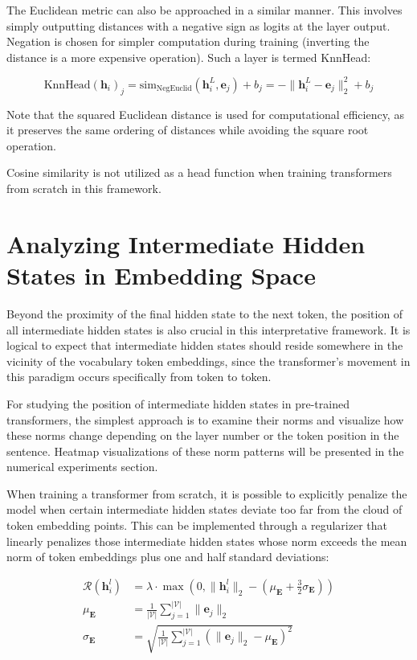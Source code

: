 The Euclidean metric can also be approached in a similar manner. This involves simply outputting distances with a negative sign as logits at the layer output. Negation is chosen for simpler computation during training (inverting the distance is a more expensive operation). Such a layer is termed KnnHead:

\begin{equation}
\text{KnnHead}(\mathbf{h}_i)_j = \text{sim}_{\text{NegEuclid}}(\mathbf{h}_i^L, \mathbf{e}_j) + b_j = -\|\mathbf{h}_i^L - \mathbf{e}_j\|_2^2 + b_j
\end{equation}

Note that the squared Euclidean distance is used for computational efficiency, as it preserves the same ordering of distances while avoiding the square root operation.

Cosine similarity is not utilized as a head function when training transformers from scratch in this framework.

\section{Analyzing Intermediate Hidden States in Embedding Space}\label{reg_info}

Beyond the proximity of the final hidden state to the next token, the position of all intermediate hidden states is also crucial in this interpretative framework. It is logical to expect that intermediate hidden states should reside somewhere in the vicinity of the vocabulary token embeddings, since the transformer's movement in this paradigm occurs specifically from token to token.

For studying the position of intermediate hidden states in pre-trained transformers, the simplest approach is to examine their norms and visualize how these norms change depending on the layer number or the token position in the sentence. Heatmap visualizations of these norm patterns will be presented in the numerical experiments section.


When training a transformer from scratch, it is possible to explicitly penalize the model when certain intermediate hidden states deviate too far from the cloud of token embedding points. This can be implemented through a regularizer that linearly penalizes those intermediate hidden states whose norm exceeds the mean norm of token embeddings plus one and half standard deviations:

\begin{align}
    \mathcal{R}(\mathbf{h}_i^l) &= \lambda \cdot \max(0, \|\mathbf{h}_i^l\|_2 - (\mu_{\mathbf{E}} + \frac{3}{2} \sigma_{\mathbf{E}})) \\
    \mu_{\mathbf{E}} &= \frac{1}{|\mathcal{V}|}\sum_{j=1}^{|\mathcal{V}|}\|\mathbf{e}_j\|_2 \\ 
    \sigma_{\mathbf{E}} &= \sqrt{\frac{1}{|\mathcal{V}|}\sum_{j=1}^{|\mathcal{V}|}(\|\mathbf{e}_j\|_2 - \mu_{\mathbf{E}})^2}
\end{align}

